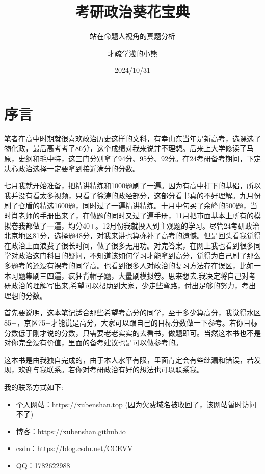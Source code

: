 \documentclass[lang=cn,newtx,10pt,scheme=chinese,pad,twocol]{zznote}
\title{考研政治葵花宝典}
\subtitle{站在命题人视角的真题分析}
\author{才疏学浅的小熊}
\institute{青岛大学}
\date{2024/10/31}
\begin{document}
\maketitle

\frontmatter
\chapter*{\siyuan 序\;\;\;\;言}
{\siyuanone

	笔者在高中时期就很喜欢政治历史这样的文科，有幸山东当年是新高考，选课选了物化政，最后高考考了86分，这个成绩对我来说并不理想。后来上大学修读了马原，史纲和毛中特，这三门分别拿了94分、95分、92分。在24考研备考期间，下定决心政治选择一定要拿到接近满分的分数。

	七月我就开始准备，把精讲精练和1000题刷了一遍。因为有高中打下的基础，所以我并没有看太多视频，只看了徐涛的政经部分，这部分看书真的不好理解。九月份刷了仓盾的精选1600题，同时过了一遍精讲精练。十月中旬买了余峰的500题，当时肖老师的手册出来了，在做题的同时又过了遍手册，11月把市面基本上所有的模拟卷我都做了一遍，均分40+。12月份我就投入到主观题的学习。尽管24考研政治北京地区81分，选择题48分，对我来讲也算弥补了高考的遗憾。但是回头看我觉得在政治上面浪费了很长时间，做了很多无用功。对完答案，在网上我也看到很多同学对政治这门科目的疑问，不知道该如何学习才能拿到高分，觉得为自己刷了那么多题考的还没有裸考的同学高。也看到很多人对政治的复习方法存在误区，比如一本习题集刷三四遍，疯狂背帽子题，大量刷模拟卷。思来想去,我决定将自己对考研政治的理解写出来,希望可以帮助到大家，少走些弯路，付出足够的努力，考出理想的分数。

	首先要说明，这本笔记适合那些希望考高分的同学，至于多少算高分，我觉得水区85+，京区75+才能说是高分，大家可以跟自己的目标分数做一下参考。若你目标分数低于刚才说的分数，只需要老老实实的去看书，做题即可。当然这本书也不是对你完全没有价值，里面的备考建议也是可以做参考的。

	这本书是由我独自完成的，由于本人水平有限，里面肯定会有些纰漏和错误，若发现，欢迎与我联系。若你对考研政治有好的想法也可以联系我。

	我的联系方式如下:
	\begin{itemize}
		\item 个人网站：\href{https://xubenshan.top}{https://xubenshan.top} \;\;(因为欠费域名被收回了，该网站暂时访问不了)
		\item 博客：\href{https://xubenshan.github.io}{https://xubenshan.github.io}
		\item csdn：\href{https://blog.csdn.net/CCEVV}{https://blog.csdn.net/CCEVV}
		\item QQ：1782622988
	\end{itemize}

}
\end{document}
